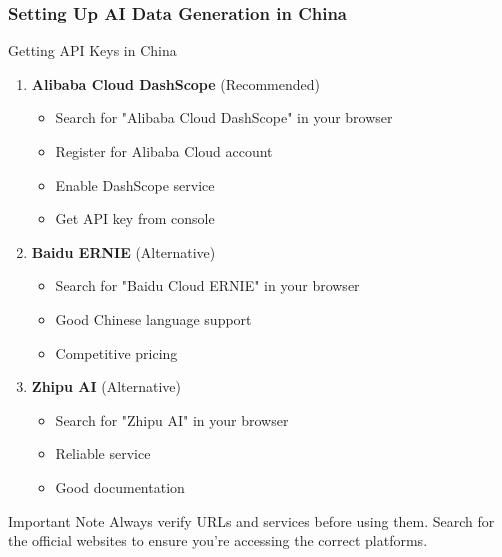 \documentclass[aspectratio=169]{beamer}
\begin{document}
\begin{frame}
\frametitle{Setting Up AI Data Generation in China}
\begin{alertblock}{Getting API Keys in China}
\begin{enumerate}
\item \textbf{Alibaba Cloud DashScope} (Recommended)
\begin{itemize}
\item Search for "Alibaba Cloud DashScope" in your browser
\item Register for Alibaba Cloud account
\item Enable DashScope service
\item Get API key from console
\end{itemize}
\item \textbf{Baidu ERNIE} (Alternative)
\begin{itemize}
\item Search for "Baidu Cloud ERNIE" in your browser
\item Good Chinese language support
\item Competitive pricing
\end{itemize}
\item \textbf{Zhipu AI} (Alternative)
\begin{itemize}
\item Search for "Zhipu AI" in your browser
\item Reliable service
\item Good documentation
\end{itemize}
\end{enumerate}
\end{alertblock}

\begin{exampleblock}{Important Note}
Always verify URLs and services before using them. Search for the official websites to ensure you're accessing the correct platforms.
\end{exampleblock}
\end{frame}
\end{document}

